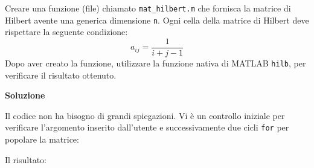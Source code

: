 \documentclass[a4paper]{article}
\begin{document}
    Creare una funzione (file) chiamato \texttt{mat\_hilbert.m} che fornisca la matrice di Hilbert avente una generica dimensione \texttt{n}. Ogni cella della matrice di Hilbert deve rispettare la seguente condizione:
    \begin{equation*}
        a_{ij} = \dfrac{1}{i + j - 1}
    \end{equation*}
    Dopo aver creato la funzione, utilizzare la funzione nativa di MATLAB \texttt{hilb}, per verificare il risultato ottenuto.

    \begin{flushleft}
        \textcolor{Green4}{\textbf{Soluzione}}
    \end{flushleft}
    Il codice non ha bisogno di grandi spiegazioni. Vi è un controllo iniziale per verificare l'argomento inserito dall'utente e successivamente due cicli \texttt{for} per popolare la matrice:
    
    Il risultato:
    


    \newpage

    {}
    

    \newpage

    \printindex
\end{document}
